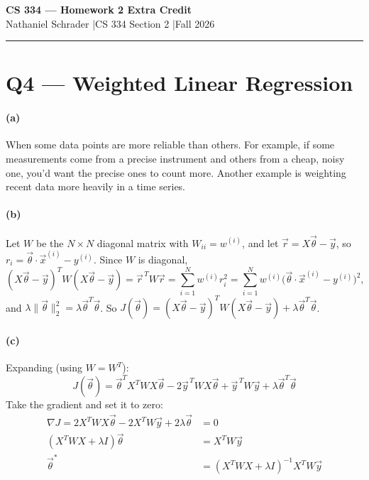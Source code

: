 \documentclass[11pt]{article}
\newcommand{\vth}{\vec\theta}
\newcommand{\x}[1]{\vec x^{(#1)}}
\begin{document}
\thispagestyle{hw}

\begin{center}
{\Large\bfseries CS 334 --- Homework 2 Extra Credit}\\[4pt]
{\large Nathaniel Schrader \quad|\quad CS 334 Section 2 \quad|\quad Fall 2026}\\[10pt]
\end{center}
\vspace{6pt}
\hrule
\vspace{10pt}

\section*{Q4 --- Weighted Linear Regression}

\paragraph{(a)} When some data points are more reliable than others. For example, if some measurements come from a precise instrument and others from a cheap, noisy one, you'd want the precise ones to count more. Another example is weighting recent data more heavily in a time series.

\paragraph{(b)} Let $W$ be the $N\times N$ diagonal matrix with $W_{ii}=w^{(i)}$, and let $\vec r=X\vth-\vec y$, so $r_i=\vth\cdot\x i-y^{(i)}$. Since $W$ is diagonal,
\[
(X\vth-\vec y)^TW(X\vth-\vec y)=\vec r^{\,T}W\vec r=\sum_{i=1}^N w^{(i)}r_i^2=\sum_{i=1}^N w^{(i)}\big(\vth\cdot\x i-y^{(i)}\big)^2,
\]
and $\lambda\|\vth\|_2^2=\lambda\vth^T\vth$. So $J(\vth)=(X\vth-\vec y)^TW(X\vth-\vec y)+\lambda\vth^T\vth$.

\paragraph{(c)} Expanding (using $W=W^T$):
\[
J(\vth)=\vth^TX^TWX\vth-2\vec y^{\,T}WX\vth+\vec y^{\,T}W\vec y+\lambda\vth^T\vth
\]
Take the gradient and set it to zero:
\begin{align*}
\nabla J=2X^TWX\vth-2X^TW\vec y+2\lambda\vth&=0\\
(X^TWX+\lambda I)\vth&=X^TW\vec y\\
\vth^*&=(X^TWX+\lambda I)^{-1}X^TW\vec y
\end{align*}
\end{document}

